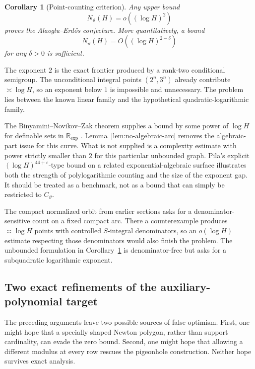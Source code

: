 \documentclass[11pt,oneside]{article}
\newtheorem{corollary}[theorem]{Corollary}
\theoremstyle{definition}
\theoremstyle{remark}
\newcommand{\R}{\mathbb R}
\newcommand{\thetaq}{\vartheta}
\begin{document}
\begin{corollary}[Point-counting criterion]
\label{cor:point-count-criterion}
Any upper bound
\[
  N_{\thetaq}(H)=o((\log H)^2)
\]
proves the Alaoglu--Erd\H{o}s conjecture.  More quantitatively, a bound
\[
  N_{\thetaq}(H)=O((\log H)^{2-\delta})
\]
for any $\delta>0$ is sufficient.
\end{corollary}

The exponent $2$ is the exact frontier produced by a rank-two conditional semigroup.  The
unconditional integral points $(2^n,3^n)$ already contribute $\asymp\log H$, so an exponent
below $1$ is impossible and unnecessary.  The problem lies between the known linear family
and the hypothetical quadratic-logarithmic family.

The Binyamini--Novikov--Zak theorem supplies a bound by some power of $\log H$ for definable
sets in $\R_{\exp}$ \cite{BinyaminiNovikovZak2024}.  Lemma~\ref{lem:no-algebraic-arc} removes
the algebraic-part issue for this curve.  What is not supplied is a complexity estimate with
power strictly smaller than $2$ for this particular unbounded graph.  Pila's explicit
$(\log H)^{44+\varepsilon}$-type bound on a related exponential-algebraic surface
\cite{Pila2010Surface,Pila2017Correction} illustrates both the strength of polylogarithmic
counting and the size of the exponent gap.  It should be treated as a benchmark, not as a
bound that can simply be restricted to $C_{\thetaq}$.

The compact normalized orbit from earlier sections asks for a denominator-sensitive count on
a fixed compact arc.  There a counterexample produces $\asymp\log H$ points with controlled
$S$-integral denominators, so an $o(\log H)$ estimate respecting those denominators would also
finish the problem.  The unbounded formulation in Corollary~\ref{cor:point-count-criterion}
is denominator-free but asks for a subquadratic logarithmic exponent.

\subsection{Two exact refinements of the auxiliary-polynomial target}
\label{sec:sparse-refinements}

The preceding arguments leave two possible sources of false optimism.  First, one might hope
that a specially shaped Newton polygon, rather than support cardinality, can evade the zero
bound.  Second, one might hope that allowing a different modulus at every row rescues the
pigeonhole construction.  Neither hope survives exact analysis.
\end{document}
